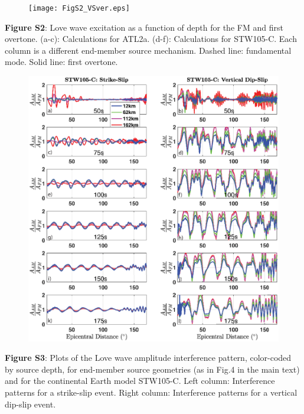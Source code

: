 \documentclass[extra,mreferee]{gji}
\begin{document}
\newpage
\begin{figure}
 \noindent\texttt{[image: FigS2\_VSver.eps]} \end{figure} 
\textbf{Figure S2}: Love wave excitation as a function of depth for the FM and first overtone. (a-c): Calculations for ATL2a. (d-f): Calculations for STW105-C. Each column is a different end-member source mechanism. Dashed line: fundamental mode. Solid line: first overtone.


\newpage
\begin{figure}
 \noindent\includegraphics[width=1\textwidth]{FigS3_VSver.eps}
\end{figure}
\textbf{Figure S3}: Plots of the Love wave amplitude interference pattern, color-coded by source depth, for end-member source geometries (as in Fig.4 in the main text) and for the continental Earth model STW105-C. Left column: Interference patterns for a strike-slip event. Right column: Interference patterns for a vertical dip-slip event.  
\end{document}

